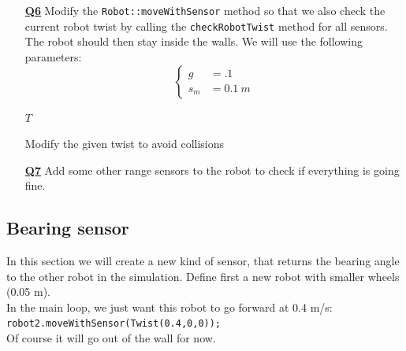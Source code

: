 \documentclass{ecnreport}
\begin{document}
\begin{itemize}
\medskip\item[\textbf{\underline{Q6}}] Modify the \texttt{Robot::moveWithSensor} method so that we also check the current robot twist by calling the \texttt{checkRobotTwist} method for all sensors. The robot should then stay inside the walls. We will use the following parameters:
\begin{equation*}
\left\{\begin{array}{ll}
g &= .1 \\
s_m &= 0.1~ m
\end{array}\right.
\end{equation*}

\begin{algorithm}[!h]
{}
\Return $T$
\caption{Modify the given twist to avoid collisions}
\label{algo:range}
\end{algorithm}
\medskip\item[\textbf{\underline{Q7}}] Add some other range sensors to the robot to check if everything is going fine.
\end{itemize}



\newpage

\subsection{Bearing sensor}

In this section we will create a new kind of sensor, that returns the bearing angle to the other robot in the simulation.
Define first a new robot with smaller wheels (0.05 m). \\
In the main loop, we just want this robot to go forward at 0.4 m/s: \\\texttt{robot2.moveWithSensor(Twist(0.4,0,0));}\\
Of course it will go out of the wall for now.
\end{document}
